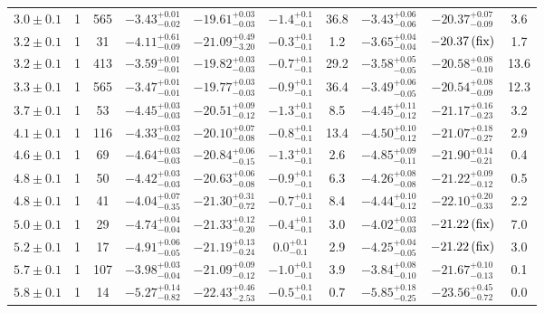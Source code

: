 \documentclass[a4paper,fleqn,usenatbib]{mnras}
\begin{document}
\begin{table*}
\begin{tabular}{ccc | cccc | ccc}
$3.0\pm0.1$ & 1 & 565 & $-3.43^{+0.01}_{-0.02}$ & $-19.61^{+0.03}_{-0.03}$ & $-1.4^{+0.1}_{-0.1}$ & 36.8 & $-3.43^{+0.06}_{-0.06}$ & $-20.37^{+0.07}_{-0.09}$ & 3.6 \\
$3.2\pm0.1$ & 1 & 31 & $-4.11^{+0.61}_{-0.09}$ & $-21.09^{+0.49}_{-3.20}$ & $-0.3^{+0.1}_{-0.1}$ & 1.2 & $-3.65^{+0.04}_{-0.04}$ & $-20.37\,{\rm (fix)}$ & 1.7 \\
$3.2\pm0.1$ & 1 & 413 & $-3.59^{+0.01}_{-0.01}$ & $-19.82^{+0.03}_{-0.03}$ & $-0.7^{+0.1}_{-0.1}$ & 29.2 & $-3.58^{+0.05}_{-0.05}$ & $-20.58^{+0.08}_{-0.10}$ & 13.6 \\
$3.3\pm0.1$ & 1 & 565 & $-3.47^{+0.01}_{-0.01}$ & $-19.77^{+0.03}_{-0.03}$ & $-0.9^{+0.1}_{-0.1}$ & 36.4 & $-3.49^{+0.06}_{-0.05}$ & $-20.54^{+0.08}_{-0.09}$ & 12.3 \\
$3.7\pm0.1$ & 1 & 53 & $-4.45^{+0.03}_{-0.03}$ & $-20.51^{+0.09}_{-0.12}$ & $-1.3^{+0.1}_{-0.1}$ & 8.5 & $-4.45^{+0.11}_{-0.12}$ & $-21.17^{+0.16}_{-0.23}$ & 3.2 \\
$4.1\pm0.1$ & 1 & 116 & $-4.33^{+0.03}_{-0.02}$ & $-20.10^{+0.07}_{-0.08}$ & $-0.8^{+0.1}_{-0.1}$ & 13.4 & $-4.50^{+0.10}_{-0.12}$ & $-21.07^{+0.18}_{-0.27}$ & 2.9 \\
$4.6\pm0.1$ & 1 & 69 & $-4.64^{+0.03}_{-0.03}$ & $-20.84^{+0.06}_{-0.15}$ & $-1.3^{+0.1}_{-0.1}$ & 2.6 & $-4.85^{+0.09}_{-0.11}$ & $-21.90^{+0.14}_{-0.21}$ & 0.4 \\
$4.8\pm0.1$ & 1 & 50 & $-4.42^{+0.03}_{-0.03}$ & $-20.63^{+0.06}_{-0.08}$ & $-0.9^{+0.1}_{-0.1}$ & 6.3 & $-4.26^{+0.08}_{-0.08}$ & $-21.22^{+0.09}_{-0.12}$ & 0.5 \\
$4.8\pm0.1$ & 1 & 41 & $-4.04^{+0.07}_{-0.35}$ & $-21.30^{+0.31}_{-0.72}$ & $-0.7^{+0.1}_{-0.1}$ & 8.4 & $-4.44^{+0.10}_{-0.12}$ & $-22.10^{+0.20}_{-0.33}$ & 2.2 \\
$5.0\pm0.1$ & 1 & 29 & $-4.74^{+0.04}_{-0.04}$ & $-21.33^{+0.12}_{-0.20}$ & $-0.4^{+0.1}_{-0.1}$ & 3.0 & $-4.02^{+0.03}_{-0.03}$ & $-21.22\,{\rm (fix)}$ & 7.0 \\
$5.2\pm0.1$ & 1 & 17 & $-4.91^{+0.06}_{-0.05}$ & $-21.19^{+0.13}_{-0.24}$ & $0.0^{+0.1}_{-0.1}$ & 2.9 & $-4.25^{+0.04}_{-0.05}$ & $-21.22\,{\rm (fix)}$ & 3.0 \\
$5.7\pm0.1$ & 1 & 107 & $-3.98^{+0.03}_{-0.04}$ & $-21.09^{+0.09}_{-0.12}$ & $-1.0^{+0.1}_{-0.1}$ & 3.9 & $-3.84^{+0.08}_{-0.10}$ & $-21.67^{+0.10}_{-0.13}$ & 0.1 \\
$5.8\pm0.1$ & 1 & 14 & $-5.27^{+0.14}_{-0.82}$ & $-22.43^{+0.46}_{-2.53}$ & $-0.5^{+0.1}_{-0.1}$ & 0.7 & $-5.85^{+0.18}_{-0.25}$ & $-23.56^{+0.45}_{-0.72}$ & 0.0 \\

\end{tabular}
\end{table*}
\end{document}
